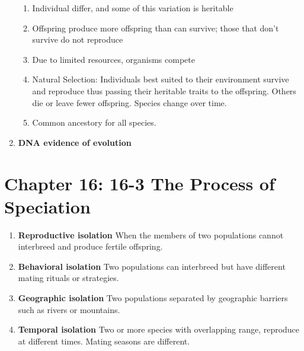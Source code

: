 \documentclass[9pt]{article}
\begin{document}
\begin{enumerate}
\begin{enumerate}
    \item Individual differ, and some of this variation is heritable
    \item Offspring produce more offspring than can survive; those
      that don’t survive do not reproduce
    \item Due to limited resources, organisms compete
    \item Natural Selection: Individuals best suited to their
      environment survive and reproduce thus passing their heritable
      traits to the offspring. Others die or leave fewer
      offspring. Species change over time.
    \item Common ancestory for all species.
    \end{enumerate}
  \item {\bf DNA evidence of evolution}
\end{enumerate}
\section*{Chapter 16: 16-3 The Process of Speciation}
\begin{enumerate}
  \item {\bf Reproductive isolation} When the members of two
    populations cannot interbreed and produce fertile offspring.
  \item {\bf Behavioral isolation} Two populations can interbreed but
    have different mating rituals or strategies.
  \item {\bf Geographic isolation} Two populations separated by
    geographic barriers such as rivers or mountains.
  \item {\bf Temporal isolation} Two or more species with overlapping
    range, reproduce at different times. Mating seasons are different.
\end{enumerate}
\end{document}
